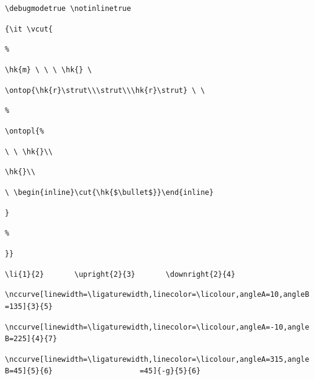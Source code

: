 \documentclass[a4paper,justified]{tufte-handout}
\begin{document}
\begin{fullwidth}
\hspace*{7.02cm}{\normalsize$\vdots$}\vspace*{8pt}

\hspace*{1cm}\begin{minipage}{.2\paperwidth}
\end{minipage}
\raisebox{20pt}{$\mapsto$ \ \ \ }
\begin{minipage}{.25\paperwidth}
{\tiny%
\verb|\debugmodetrue \notinlinetrue|\medskip

\verb|{\it \vcut{|

{\lightgray \verb|%|}

\verb|\hk{m} \ \ \ \hk{} \ |

\verb|\ontop{\hk{r}\strut\\\strut\\\hk{r}\strut} \ \ |

{\lightgray \verb|%|}

\verb|\ontopl{|{\lightgray \verb|%|}

\verb|\ \ \hk{}\\|

\verb|\hk{}\\|

\verb|\ \begin{inline}\cut{\hk{$\bullet$}}\end{inline}|

\verb|}|

{\lightgray \verb|%|}

\verb|}}|\medskip

\verb|\li{1}{2}       \upright{2}{3}       \downright{2}{4}|

\verb|\nccurve[linewidth=\ligaturewidth,linecolor=\licolour,angleA=10,angleB=135]{3}{5}|

\verb|\nccurve[linewidth=\ligaturewidth,linecolor=\licolour,angleA=-10,angleB=225]{4}{7}|

\verb|\nccurve[linewidth=\ligaturewidth,linecolor=\licolour,angleA=315,angleB=45]{5}{6}                    =45]{-g}{5}{6}|

}
\end{minipage}
\end{fullwidth}
\end{document}
